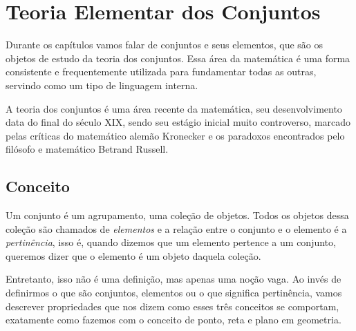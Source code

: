 \chapter{Teoria Elementar dos Conjuntos}
Durante os capítulos vamos falar de conjuntos e seus elementos, que são os objetos de estudo da teoria dos conjuntos. Essa área da matemática é uma forma consistente e frequentemente utilizada para fundamentar todas as outras, servindo como um tipo de linguagem interna.

A teoria dos conjuntos é uma área recente da matemática, seu desenvolvimento data do final do século XIX, sendo seu estágio inicial muito controverso, marcado pelas críticas do matemático alemão Kronecker e os paradoxos encontrados pelo filósofo e matemático Betrand Russell.
\section{Conceito}
Um conjunto é um agrupamento, uma coleção de objetos. Todos os objetos dessa coleção são chamados de \emph{elementos} e a relação entre o conjunto e o elemento é a \emph{pertinência}, isso é, quando dizemos que um elemento pertence a um conjunto, queremos dizer que o elemento é um objeto daquela coleção.

Entretanto, isso não é uma definição, mas apenas uma noção vaga. Ao invés de definirmos o que são conjuntos, elementos ou o que significa pertinência, vamos descrever propriedades que nos dizem como esses três conceitos se comportam, exatamente como fazemos com o conceito de ponto, reta e plano em geometria.



